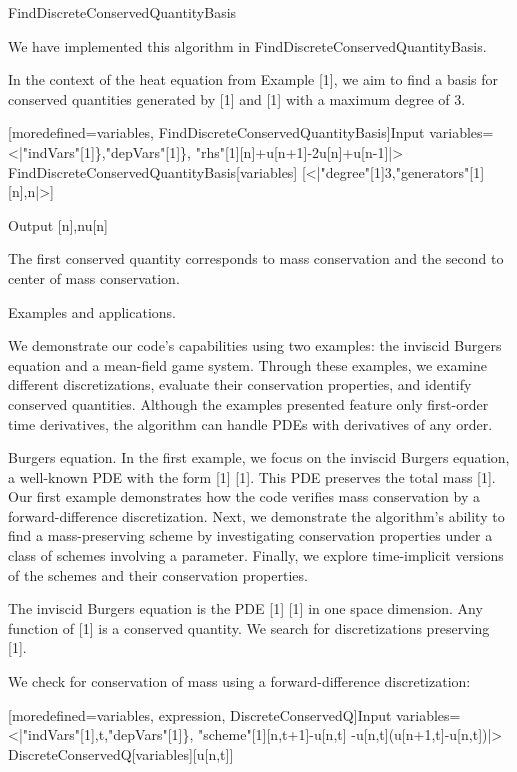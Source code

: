 \documentclass{article}
\begin{document}
{	{{FindDiscreteConservedQuantityBasis}}
	

We have implemented this algorithm in {FindDiscreteConservedQuantityBasis}.

In the context of the heat equation from Example [1], we aim to find a basis for conserved quantities generated by [1] and [1] with a maximum degree of 3.
	
	
		[moredefined={variables, FindDiscreteConservedQuantityBasis}]{Input}
  variables=<|"indVars"[1]\},"depVars"[1]\},
  "rhs"[1][n]+u[n+1]-2u[n]+u[n-1]|>
  FindDiscreteConservedQuantityBasis[variables]
  [<|"degree"[1]3,"generators"[1][n],n|>]
  

		{Output}
  [n],nu[n]

	
The first conserved quantity corresponds to mass conservation and the second to center of mass conservation. 

Examples and applications.



We demonstrate our code's capabilities using two examples: the inviscid Burgers equation and a mean-field game system. 
Through these examples, we examine different discretizations, evaluate their conservation properties, and identify conserved quantities.
Although the examples presented feature only first-order time derivatives, the algorithm can handle PDEs with derivatives of any order.

{Burgers equation.}
In the first example, we focus on the inviscid Burgers equation, a well-known PDE with the form [1] [1]. 
This PDE preserves the total mass [1].
Our first example demonstrates how the code verifies mass conservation by a forward-difference discretization.
Next, we demonstrate the algorithm's ability to find a mass-preserving scheme by investigating conservation properties under a class of schemes involving a parameter.
Finally, we explore time-implicit versions of the schemes and their conservation properties.

The inviscid Burgers equation is the PDE [1] [1] in one space dimension. Any function of [1] is a conserved quantity. We search for discretizations preserving [1].

	We check for conservation of mass using a forward-difference discretization:
	
	
		[moredefined={variables, expression, DiscreteConservedQ}]{Input}
  variables=<|"indVars"[1],t,"depVars"[1]\},
  "scheme"[1][n,t+1]-u[n,t]
  -u[n,t](u[n+1,t]-u[n,t])|>
  DiscreteConservedQ[variables][u[n,t]]
  

}
\end{document}

